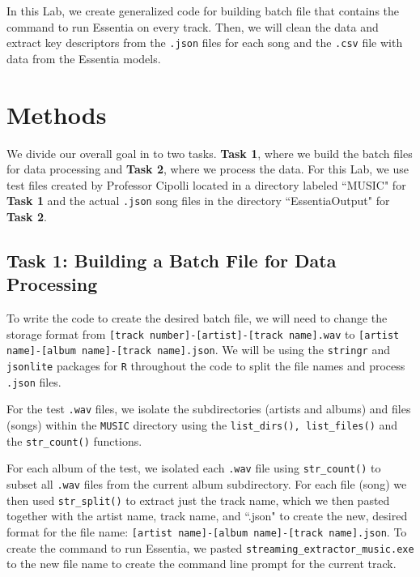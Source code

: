 \documentclass{article}\usepackage[]{graphicx}\usepackage[]{xcolor}
\begin{document}
\begin{multicols}{2}
  In this Lab, we create generalized code for building batch file that contains the command to run Essentia on every track. Then, we will clean the data and extract key descriptors from the \texttt{.json} files for each song and the \texttt{.csv} file with data from the Essentia models. 



\section{Methods}
  We divide our overall goal in to two tasks. \textbf{Task 1}, where we build the batch files for data processing and \textbf{Task 2}, where we process the data. For this Lab, we use test files created by Professor Cipolli located in a directory labeled ``MUSIC" for \textbf{Task 1} and the actual \texttt{.json} song files in the directory ``EssentiaOutput" for \textbf{Task 2}.


\subsection{Task 1: Building a Batch File for Data Processing}
  To write the code to create the desired batch file, we will need to change the storage format from \texttt{[track number]-[artist]-[track name].wav} to \texttt{[artist name]-[album name]-[track name].json}. We will be using the \texttt{stringr} \citep{stringr} and \texttt{jsonlite} \citep{jsonlite} packages for \texttt{R} throughout the code to split the file names and process \texttt{.json} files.
  







For the test \texttt{.wav} files, we isolate the subdirectories (artists and albums) and files (songs) within the \texttt{MUSIC} directory using the \texttt{list\_dirs(), list\_files()} and the \texttt{str\_count()} functions.







  For each album of the test, we isolated each \texttt{.wav} file using \texttt{str\_count()} to subset all \texttt{.wav} files from the current album subdirectory. For each file (song) we then used \texttt{str\_split()} to extract just the track name, which we then pasted together with the artist name, track name, and ``.json" to create the new, desired format for the file name: \texttt{[artist name]-[album name]-[track name].json}.
  To create the command to run Essentia, we pasted \texttt{streaming\_extractor\_music.exe} to the new file name to create the command line prompt for the current track.








\end{multicols}
\end{document}

